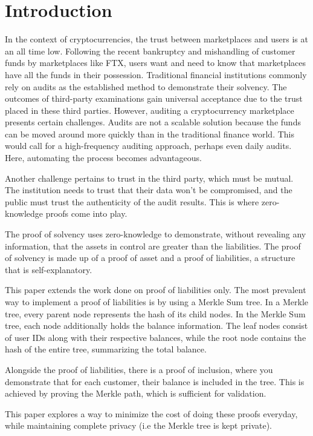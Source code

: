 
\chapter{Introduction}

In the context of cryptocurrencies, the trust between marketplaces and users is at an all time low. Following the recent bankruptcy and mishandling of customer funds by marketplaces like FTX, users want and need to know that marketplaces have all the funds in their possession. 
Traditional financial institutions commonly rely on audits as the established method to demonstrate their solvency. The outcomes of third-party examinations gain universal acceptance due to the trust placed in these third parties. However, auditing a cryptocurrency marketplace presents certain challenges. 
Audits are not a scalable solution because the funds can be moved around more quickly than in the traditional finance world. This would call for a high-frequency auditing approach, perhaps even daily audits. Here, automating the process becomes advantageous.

Another challenge pertains to trust in the third party, which must be mutual. The institution needs to trust that their data won't be compromised, and the public must trust the authenticity of the audit results. This is where zero-knowledge proofs come into play. 

The proof of solvency uses zero-knowledge to demonstrate, without revealing any information, that the assets in control are greater than the liabilities. The proof of solvency is made up of a proof of asset and a proof of liabilities, a structure that is self-explanatory.

This paper extends the work done on proof of liabilities only. The most prevalent way to implement a proof of liabilities is by using a Merkle Sum tree. 
In a Merkle tree, every parent node represents the hash of its child nodes. In the Merkle Sum tree, each node additionally holds the balance information. The leaf nodes consist of user IDs along with their respective balances, while the root node contains the hash of the entire tree, summarizing the total balance.

Alongside the proof of liabilities, there is a proof of inclusion, where you demonstrate that for each customer, their balance is included in the tree. This is achieved by proving the Merkle path, which is sufficient for validation.

This paper explores a way to minimize the cost of doing these proofs everyday, while maintaining complete privacy (i.e the Merkle tree is kept private).


